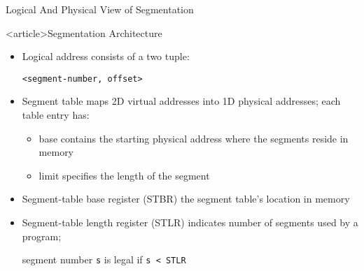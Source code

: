 
\begin{frame}{Logical And Physical View of Segmentation}
  \begin{center}
  \end{center}
\end{frame}

\begin{frame}<article>{Segmentation Architecture}
  \begin{itemize}
  \item Logical address consists of a \alert{two tuple}:
    \begin{center}
      \texttt{<segment-number, offset>}
    \end{center}
  \item \alert{Segment table} maps 2D virtual addresses into 1D physical
    addresses; each table entry has:
    \begin{itemize}
    \item \alert{base} contains the starting physical address where the segments
      reside in memory
    \item \alert{limit} specifies the length of the segment
    \end{itemize}
  \item \alert{Segment-table base register (STBR)} {\pright} the segment table's
    location in memory
  \item \alert{Segment-table length register (STLR)} indicates number of
    segments used by a program;
    \begin{center}
      segment number \texttt{s} is legal if \texttt{s < STLR}
    \end{center}
  \end{itemize}
\end{frame}

